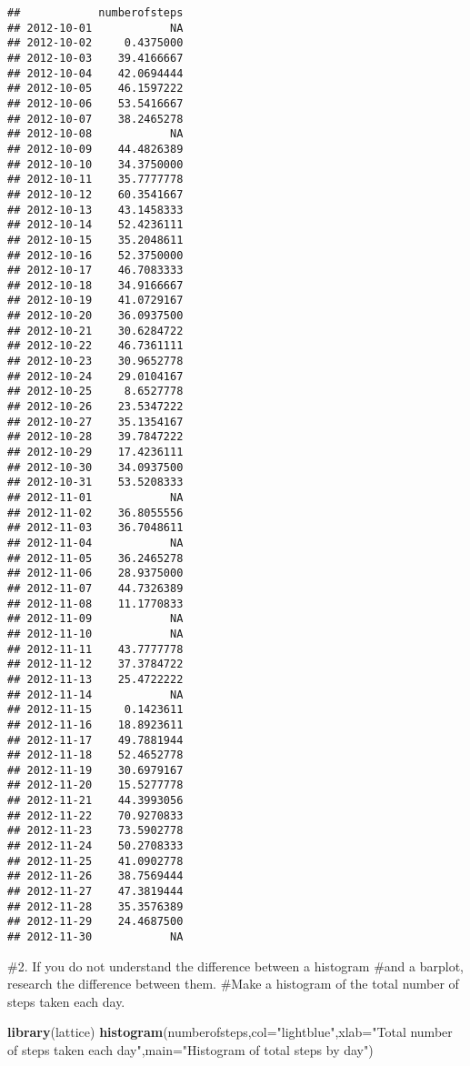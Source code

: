 \documentclass[
]{article}
\newenvironment{Shaded}{\begin{snugshade}}{\end{snugshade}}
\newcommand{\DataTypeTok}[1]{\textcolor[rgb]{0.13,0.29,0.53}{#1}}
\newcommand{\KeywordTok}[1]{\textcolor[rgb]{0.13,0.29,0.53}{\textbf{#1}}}
\newcommand{\NormalTok}[1]{#1}
\newcommand{\StringTok}[1]{\textcolor[rgb]{0.31,0.60,0.02}{#1}}
\begin{document}
\begin{verbatim}
##            numberofsteps
## 2012-10-01            NA
## 2012-10-02     0.4375000
## 2012-10-03    39.4166667
## 2012-10-04    42.0694444
## 2012-10-05    46.1597222
## 2012-10-06    53.5416667
## 2012-10-07    38.2465278
## 2012-10-08            NA
## 2012-10-09    44.4826389
## 2012-10-10    34.3750000
## 2012-10-11    35.7777778
## 2012-10-12    60.3541667
## 2012-10-13    43.1458333
## 2012-10-14    52.4236111
## 2012-10-15    35.2048611
## 2012-10-16    52.3750000
## 2012-10-17    46.7083333
## 2012-10-18    34.9166667
## 2012-10-19    41.0729167
## 2012-10-20    36.0937500
## 2012-10-21    30.6284722
## 2012-10-22    46.7361111
## 2012-10-23    30.9652778
## 2012-10-24    29.0104167
## 2012-10-25     8.6527778
## 2012-10-26    23.5347222
## 2012-10-27    35.1354167
## 2012-10-28    39.7847222
## 2012-10-29    17.4236111
## 2012-10-30    34.0937500
## 2012-10-31    53.5208333
## 2012-11-01            NA
## 2012-11-02    36.8055556
## 2012-11-03    36.7048611
## 2012-11-04            NA
## 2012-11-05    36.2465278
## 2012-11-06    28.9375000
## 2012-11-07    44.7326389
## 2012-11-08    11.1770833
## 2012-11-09            NA
## 2012-11-10            NA
## 2012-11-11    43.7777778
## 2012-11-12    37.3784722
## 2012-11-13    25.4722222
## 2012-11-14            NA
## 2012-11-15     0.1423611
## 2012-11-16    18.8923611
## 2012-11-17    49.7881944
## 2012-11-18    52.4652778
## 2012-11-19    30.6979167
## 2012-11-20    15.5277778
## 2012-11-21    44.3993056
## 2012-11-22    70.9270833
## 2012-11-23    73.5902778
## 2012-11-24    50.2708333
## 2012-11-25    41.0902778
## 2012-11-26    38.7569444
## 2012-11-27    47.3819444
## 2012-11-28    35.3576389
## 2012-11-29    24.4687500
## 2012-11-30            NA
\end{verbatim}

\#2. If you do not understand the difference between a histogram \#and a
barplot, research the difference between them. \#Make a histogram of the
total number of steps taken each day.

\begin{Shaded}
\begin{Highlighting}[]
\KeywordTok{library}\NormalTok{(lattice)}
\KeywordTok{histogram}\NormalTok{(numberofsteps,}\DataTypeTok{col=}\StringTok{"lightblue"}\NormalTok{,}\DataTypeTok{xlab=}\StringTok{"Total number of steps taken each day"}\NormalTok{,}\DataTypeTok{main=}\StringTok{"Histogram of total steps by day"}\NormalTok{)}
\end{Highlighting}
\end{Shaded}
\end{document}
